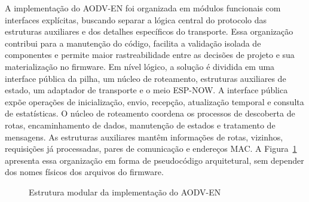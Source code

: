 A implementação do AODV-EN foi organizada em módulos funcionais com
interfaces explícitas, buscando separar a lógica central do protocolo
das estruturas auxiliares e dos detalhes específicos do transporte. Essa
organização contribui para a manutenção do código, facilita a validação
isolada de componentes e permite maior rastreabilidade entre as decisões
de projeto e sua materialização no firmware. Em nível lógico, a solução
é dividida em uma interface pública da pilha, um núcleo de roteamento,
estruturas auxiliares de estado, um adaptador de transporte e o meio
ESP-NOW. A interface pública expõe operações de inicialização, envio,
recepção, atualização temporal e consulta de estatísticas. O núcleo de
roteamento coordena os processos de descoberta de rotas, encaminhamento
de dados, manutenção de estados e tratamento de mensagens. As estruturas
auxiliares mantêm informações de rotas, vizinhos, requisições já
processadas, pares de comunicação e endereços MAC. A Figura~\ref{fig:modular} apresenta
essa organização em forma de pseudocódigo arquitetural, sem depender dos
nomes físicos dos arquivos do firmware.
\begin{figure}[H]
\centering
{}
\caption{Estrutura modular da implementação do AODV-EN}\label{fig:modular}
\end{figure}

